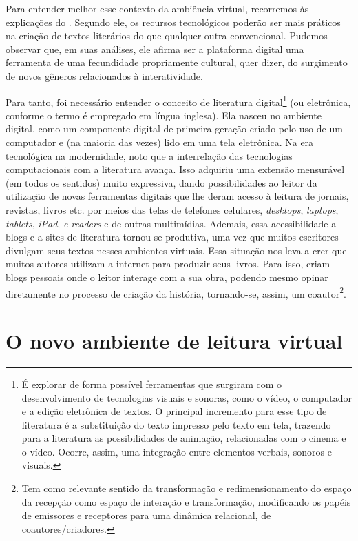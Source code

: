 \begin{refsection}
    Para entender melhor esse contexto da ambiência virtual, recorremos às explicações do \textcite{Levy1999Cibercultura}. Segundo ele, os recursos tecnológicos poderão ser mais práticos  na criação de textos literários do que qualquer outra convencional. Pudemos observar que, em suas análises, ele afirma ser a plataforma digital uma ferramenta  de uma fecundidade  propriamente cultural, quer dizer, do surgimento de novos gêneros relacionados à interatividade. 

    Para tanto,  foi necessário entender o conceito de literatura digital\footnote{É explorar de forma possível ferramentas que surgiram com o desenvolvimento de tecnologias visuais e sonoras, como o vídeo, o computador e a edição eletrônica de textos. O principal incremento para esse tipo de literatura é a substituição do texto impresso pelo texto em tela, trazendo para a literatura as possibilidades de animação, relacionadas com o cinema e o vídeo. Ocorre, assim, uma integração entre elementos verbais, sonoros e visuais.} (ou eletrônica, conforme o termo é empregado em língua inglesa). Ela nasceu no ambiente digital, como um componente digital de primeira geração criado pelo uso de um computador e (na maioria das vezes) lido em uma tela eletrônica. Na era tecnológica na modernidade, noto que a interrelação das tecnologias computacionais com a literatura avança. Isso adquiriu uma extensão mensurável (em todos os sentidos) muito expressiva, dando possibilidades ao leitor da utilização de novas ferramentas digitais que lhe deram acesso à leitura de jornais, revistas, livros etc. por meios das telas de telefones celulares, \textit{desktops}, \textit{laptops}, \textit{tablets}, \textit{iPad}, \textit{e-readers} e de outras multimídias. Ademais, essa acessibilidade a blogs e a sites de literatura tornou-se produtiva, uma vez que muitos escritores divulgam seus textos nesses ambientes virtuais. Essa situação nos leva a crer que muitos autores utilizam a internet para produzir seus livros. Para isso, criam blogs pessoais onde o leitor interage com a sua obra, podendo mesmo opinar diretamente no processo de criação da história, tornando-se, assim, um coautor\footnote{Tem como relevante sentido da transformação e redimensionamento do espaço da recepção como espaço de interação e transformação, modificando os papéis de emissores e receptores para uma dinâmica relacional, de coautores/criadores.}.   

    \section{O novo ambiente de leitura virtual}


\end{refsection}
